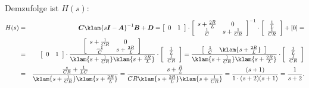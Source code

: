 {\begin{enumerate}
Demzufolge ist $H(s)$:
\begin{eqnarray*}
H(s) &=& \boldsymbol{C}\klam{s\boldsymbol{I}-\boldsymbol{A}}^{-1}\boldsymbol{B}+\boldsymbol{D}=
\left [ 
\begin{array}{c c}
0  & 1\\
\end{array}
\right ]\cdot
\left [
\begin{array}{cc}
 s+\frac{2R}{L} & 0\\
\frac{1}{C}& s+\frac{1}{CR}\\
\end{array}
\right ]^{-1}\cdot
\left [ 
\begin{array}{c}
 \frac{1}{L}\\
\frac{1}{CR}\\
\end{array}
\right ] + [0]=\\
&=&
\left [ 
\begin{array}{c c}
0  & 1\\
\end{array}
\right ]\cdot
\frac{\left [
\begin{array}{cc}
 s+\frac{1}{CR} & 0\\
\frac{-1}{C}& s+\frac{2R}{L}\\
\end{array}
\right ]}{\klam{s+\frac{1}{CR}}\klam{s+\frac{2R}{L}}}\cdot
\left [ 
\begin{array}{c}
 \frac{1}{L}\\
\frac{1}{CR}\\
\end{array}
\right ]
=\frac{\left [
\begin{array}{cc}
 \frac{1}{C} & \klam{s+\frac{2R}{L}} \\
\end{array}
\right ]}{\klam{s+\frac{1}{CR}}\klam{s+\frac{2R}{L}}}\cdot
\left [ 
\begin{array}{c}
 \frac{1}{L}\\
\frac{1}{CR}\\
\end{array}
\right ]\\
&=&\frac{\frac{s}{CR}+\frac{1}{LC}}{\klam{s+\frac{1}{CR}}\klam{s+\frac{2R}{L}}}=\frac {s+\frac{R}{L}} {CR\klam{s+\frac{2R}{L}} \klam{s+\frac{1}{CR}} }=\frac{(s+1)}{1\cdot (s+2)(s+1)}=\frac{1}{s+2}.
\end{eqnarray*}


\end{enumerate}}
